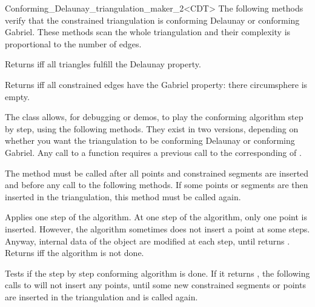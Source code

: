 \begin{ccRefClass}{Conforming_Delaunay_triangulation_maker_2<CDT>}
The following methods verify that the constrained triangulation is
conforming Delaunay or conforming Gabriel. These methods scan the
whole triangulation and their complexity is proportional to the number
of edges.

{ Returns  iff all triangles fulfill the Delaunay property.}

{ Returns  iff all constrained edges have the Gabriel property:
  there circumsphere is empty. }

\begin{ccAdvanced}


The \ccRefName{} class allows, for debugging or demos, to play the
conforming algorithm step by step, using the following methods. They
exist in two versions, depending on whether you want the triangulation to
be conforming Delaunay or conforming Gabriel. Any call to a
 function requires a previous call to
the corresponding of .

{ The method must be called after all points and constrained segments
  are inserted and before any call to the following methods. If some
  points or segments are then inserted in the triangulation, this
  method must be called again. }

{ Applies one step of the algorithm. At one step of the algorithm,
  only one point is inserted. However, the algorithm sometimes does not
  insert a point at some steps. Anyway, internal data of the \ccRefName{}
  object are modified at each step, until 
  returns . Returns  iff the algorithm is not done.}



{ Tests if the step by step conforming algorithm is done. If it
  returns , the following calls to
   will not insert any points, until some
  new constrained segments or points are inserted in the triangulation and
   is called again. }

\end{ccAdvanced}

\end{ccRefClass}

